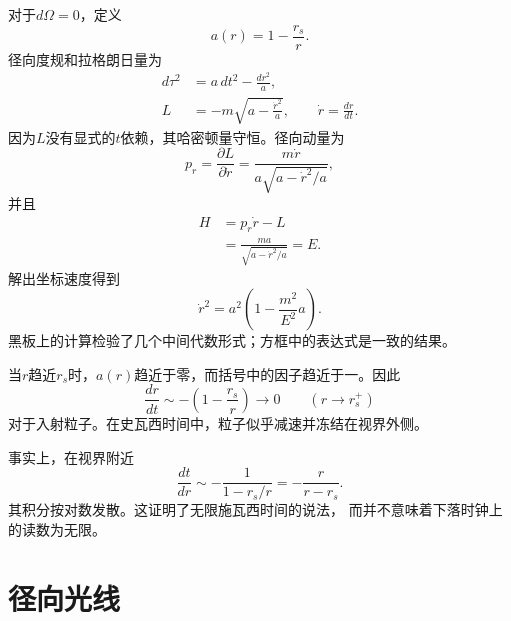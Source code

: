 对于\(d\Omega=0\)，定义
\begin{equation}
a(r)=1-\frac{r_s}{r}.
\label{eq:l5-a-def}
\end{equation}
径向度规和拉格朗日量为
\begin{align}
d\tau^2&=a\,dt^2-\frac{dr^2}{a},\\
L&=-m\sqrt{a-\frac{\dot r^2}{a}},
\qquad
\dot r=\frac{dr}{dt}.
\label{eq:l5-radial-lagrangian}
\end{align}
因为\(L\)没有显式的\(t\)依赖，其哈密顿量守恒。径向动量为
\begin{equation}
p_r=\frac{\partial L}{\partial\dot r}
=\frac{m\dot r}{a\sqrt{a-\dot r^2/a}},
\label{eq:l5-radial-momentum}
\end{equation}
并且
\begin{align}
H
&=p_r\dot r-L\\
&=\frac{ma}{\sqrt{a-\dot r^2/a}}
=E.
\label{eq:l5-radial-energy}
\end{align}
解出坐标速度得到
\begin{equation}
\boxed{
\dot r^2
=a^2\left(1-\frac{m^2}{E^2}a\right).
}
\label{eq:l5-radial-velocity}
\end{equation}
黑板上的计算检验了几个中间代数形式；方框中的表达式是一致的结果。

当\(r\)趋近\(r_s\)时，\(a(r)\)趋近于零，而括号中的因子趋近于一。因此
\begin{equation}
\frac{dr}{dt}
\sim -\left(1-\frac{r_s}{r}\right)
\longrightarrow 0
\qquad(r\longrightarrow r_s^+)
\label{eq:l5-infall-freeze}
\end{equation}
对于入射粒子。在史瓦西时间中，粒子似乎减速并冻结在视界外侧。

\begin{classroomqa}
\end{classroomqa}

事实上，在视界附近
\begin{equation}
\frac{dt}{dr}
\sim-\frac{1}{1-r_s/r}
=-\frac{r}{r-r_s}.
\end{equation}
其积分按对数发散。这证明了无限施瓦西时间的说法，
而并不意味着下落时钟上的读数为无限。

\section{径向光线}

